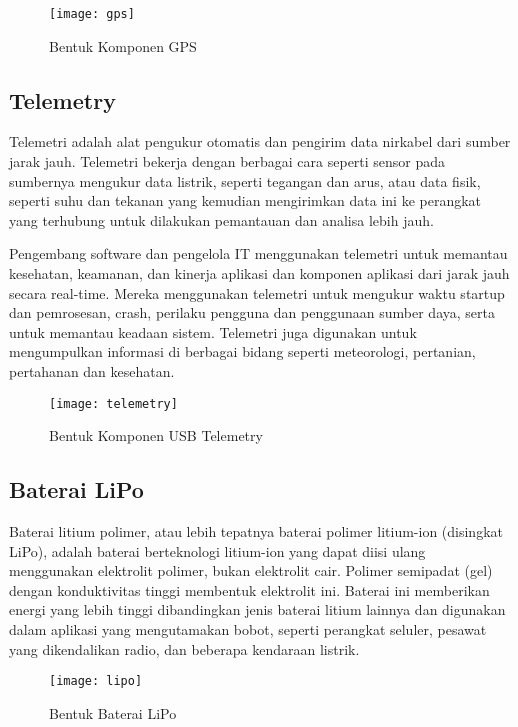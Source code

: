 \begin{figure}[H]
	\centering
	\texttt{[image: gps]}
	\caption{Bentuk Komponen GPS}
	\label{fig:gps}
\end{figure}

\subsection{Telemetry}
Telemetri adalah alat pengukur otomatis dan pengirim data nirkabel dari sumber jarak jauh. Telemetri bekerja dengan berbagai cara seperti sensor pada sumbernya mengukur data listrik, seperti tegangan dan arus, atau data fisik, seperti suhu dan tekanan yang kemudian mengirimkan data ini ke perangkat yang terhubung untuk dilakukan pemantauan dan analisa lebih jauh.

Pengembang software dan pengelola IT menggunakan telemetri untuk memantau kesehatan, keamanan, dan kinerja aplikasi dan komponen aplikasi dari jarak jauh secara real-time. Mereka menggunakan telemetri untuk mengukur waktu startup dan pemrosesan, crash, perilaku pengguna dan penggunaan sumber daya, serta untuk memantau keadaan sistem. Telemetri juga digunakan untuk mengumpulkan informasi di berbagai bidang seperti meteorologi, pertanian, pertahanan dan kesehatan.

\begin{figure}[H]
	\centering
	\texttt{[image: telemetry]}
	\caption{Bentuk Komponen USB Telemetry}
	\label{fig:telemetry}
\end{figure}

\subsection{Baterai LiPo}
Baterai litium polimer, atau lebih tepatnya baterai polimer litium-ion (disingkat LiPo), adalah baterai berteknologi litium-ion yang dapat diisi ulang menggunakan elektrolit polimer, bukan elektrolit cair. Polimer semipadat (gel) dengan konduktivitas tinggi membentuk elektrolit ini. Baterai ini memberikan energi yang lebih tinggi dibandingkan jenis baterai litium lainnya dan digunakan dalam aplikasi yang mengutamakan bobot, seperti perangkat seluler, pesawat yang dikendalikan radio, dan beberapa kendaraan listrik.

\begin{figure}[H]
	\centering
	\texttt{[image: lipo]}
	\caption{Bentuk Baterai LiPo}
	\label{fig:lipo}
\end{figure}

